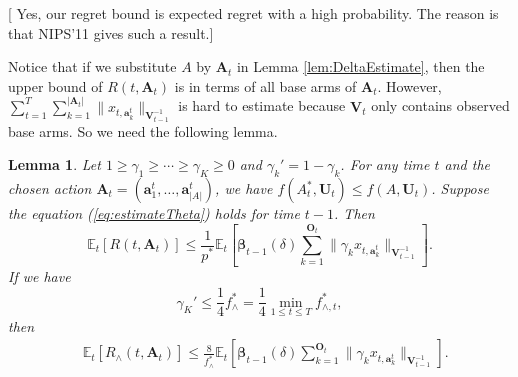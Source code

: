\documentclass{article}
\newcommand{\bbeta}{\boldsymbol{\beta}}
\newcommand{\EE}{\mathbb{E}}
\newcommand{\bA}{\mathbf{A}}
\newcommand{\ba}{\mathbf{a}}
\newcommand{\bO}{\mathbf{O}}
\newcommand{\bU}{\mathbf{U}}
\newcommand{\bV}{\mathbf{V}}
\newcommand{\cH}{\mathcal{H}}
\newcommand{\abs}[1]{\left| #1 \right|}
\newcommand{\norm}[1]{\| #1 \|}
\newtheorem{lemma}[theorem]{Lemma}%
\newcommand{\wei}[1]{}
\newcommand{\wei}[1]{{\color{blue!50!black}  [\text{Wei:} #1]}}
\newcommand{\shuai}[1]{{\color{brown!60!black} [\text{Shuai:} #1]}}
\begin{document}
\wei{This lemma needs to be clarified, using Lemma 4.6.
Also, our regret bound is expected regret but with a high probability? Sound a 
bit strange.}
\shuai{Yes, our regret bound is expected regret with a high probability. The reason is that NIPS'11 gives such a result.}

Notice that if we substitute $A$ by $\bA_t$ in Lemma \ref{lem:DeltaEstimate}, then the upper bound of $R(t, \bA_t)$ is in terms of all base arms of $\bA_t$. However, $\sum_{t=1}^T \sum_{k=1}^{\abs{\bA_t}} \norm{ x_{t, \ba_k^t} }_{ \bV_{t-1}^{-1} }$ is hard to estimate because $\bV_t$ only contains observed base arms. So we need the following lemma.

\begin{lemma}
\label{lem:DeltaEsimateWithP*}
Let $1 \geq \gamma_1 \geq \cdots \geq \gamma_K \geq 0$ and $\gamma_k' = 1 - \gamma_k$. For any time $t$ and the chosen action $\bA_t = (\ba_1^t, \ldots, \ba_{\abs{A}}^t )$, we have $f(A_t^*, \bU_t) \leq f(A, \bU_t)$. Suppose the equation (\ref{eq:estimateTheta}) holds for time $t-1$. Then
$$
\EE_t[R(t, \bA_t)] \leq \frac{1}{p^*} \EE_t \left[ \bbeta_{t-1}(\delta) \sum_{k=1}^{\bO_t}\norm{\gamma_k x_{t,\ba_k^t}}_{\bV_{t-1}^{-1}} \right].
$$
If we have
$$
\gamma_K' \le \frac{1}{4} f_{\wedge}^{\ast} = \frac{1}{4} \min_{1 \leq t \leq T} f_{\wedge, t}^{\ast},
$$
then
\begin{align*}
&\EE_t [R_{\wedge}(t, \bA_t) ] \leq \frac{8}{f_{\wedge}^{\ast}} \EE_t \left[ \bbeta_{t-1}(\delta)\sum_{k=1}^{\bO_t}\norm{\gamma_k x_{t,\ba_k^t}}_{\bV_{t-1}^{-1}} \right].
\end{align*}
\end{lemma}
\end{document}
